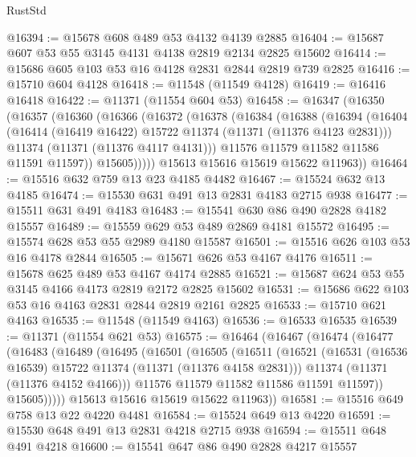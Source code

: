 \begin{lexlean}{RustStd}
\begin{coremodule}
@16394 := @15678 @608 @489 @53 @4132 @4139 @2885
@16404 := @15687 @607 @53 @55 @3145 @4131 @4138 @2819 @2134 @2825 @15602
@16414 := @15686 @605 @103 @53 @16 @4128 @2831 @2844 @2819 @739 @2825
@16416 := @15710 @604 @4128
@16418 := @11548 (@11549 @4128)
@16419 := @16416 @16418
@16422 := @11371 (@11554 @604 @53)
@16458 := @16347
    (@16350
      (@16357
        (@16360
          (@16366
            (@16372
              (@16378
                (@16384
                  (@16388
                    (@16394
                      (@16404
                        (@16414 (@16419 @16422) @15722 @11374 (@11371 (@11376 @4123 @2831)))
                        @11374
                        (@11371 (@11376 @4117 @4131)))
                      @11576
                      @11579
                      @11582
                      @11586
                      @11591
                      @11597))
                  @15605)))))
        @15613
        @15616
        @15619
        @15622
        @11963))
@16464 := @15516 @632 @759 @13 @23 @4185 @4482
@16467 := @15524 @632 @13 @4185
@16474 := @15530 @631 @491 @13 @2831 @4183 @2715 @938
@16477 := @15511 @631 @491 @4183
@16483 := @15541 @630 @86 @490 @2828 @4182 @15557
@16489 := @15559 @629 @53 @489 @2869 @4181 @15572
@16495 := @15574 @628 @53 @55 @2989 @4180 @15587
@16501 := @15516 @626 @103 @53 @16 @4178 @2844
@16505 := @15671 @626 @53 @4167 @4176
@16511 := @15678 @625 @489 @53 @4167 @4174 @2885
@16521 := @15687 @624 @53 @55 @3145 @4166 @4173 @2819 @2172 @2825 @15602
@16531 := @15686 @622 @103 @53 @16 @4163 @2831 @2844 @2819 @2161 @2825
@16533 := @15710 @621 @4163
@16535 := @11548 (@11549 @4163)
@16536 := @16533 @16535
@16539 := @11371 (@11554 @621 @53)
@16575 := @16464
    (@16467
      (@16474
        (@16477
          (@16483
            (@16489
              (@16495
                (@16501
                  (@16505
                    (@16511
                      (@16521
                        (@16531 (@16536 @16539) @15722 @11374 (@11371 (@11376 @4158 @2831)))
                        @11374
                        (@11371 (@11376 @4152 @4166)))
                      @11576
                      @11579
                      @11582
                      @11586
                      @11591
                      @11597))
                  @15605)))))
        @15613
        @15616
        @15619
        @15622
        @11963))
@16581 := @15516 @649 @758 @13 @22 @4220 @4481
@16584 := @15524 @649 @13 @4220
@16591 := @15530 @648 @491 @13 @2831 @4218 @2715 @938
@16594 := @15511 @648 @491 @4218
@16600 := @15541 @647 @86 @490 @2828 @4217 @15557

\end{coremodule}
\end{lexlean}

